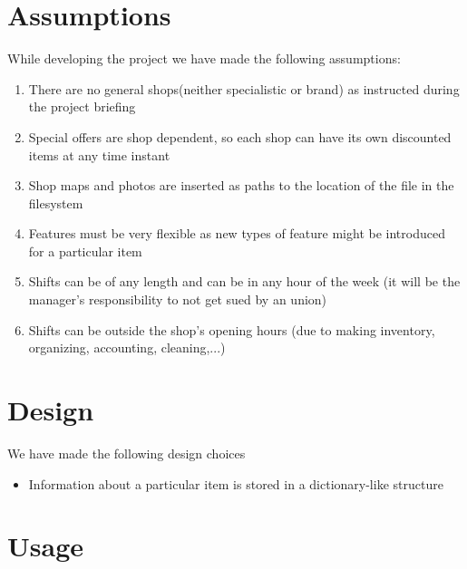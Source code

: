 \documentclass[a4paper]{article}
\begin{document}
\section{Assumptions}
While developing the project we have made the following assumptions:
\begin{enumerate}
	\item There are no general shops(neither specialistic or brand) as instructed during the project briefing
	\item Special offers are shop dependent, so each shop can have its own discounted items at any time instant
	\item Shop maps and photos are inserted as paths to the location of the file in the filesystem
	\item Features must be very flexible as new types of feature might be introduced for a particular item
	\item Shifts can be of any length and can be in any hour of the week (it will be the manager's responsibility to not get sued by an union)
	\item Shifts can be outside the shop's opening hours (due to making inventory, organizing, accounting, cleaning,...)
	
\end{enumerate}

\section{Design}
We have made the following design choices
\begin{itemize}
	\item Information about a particular item is stored in a dictionary-like structure
\end{itemize}

\section{Usage}
\end{document}
